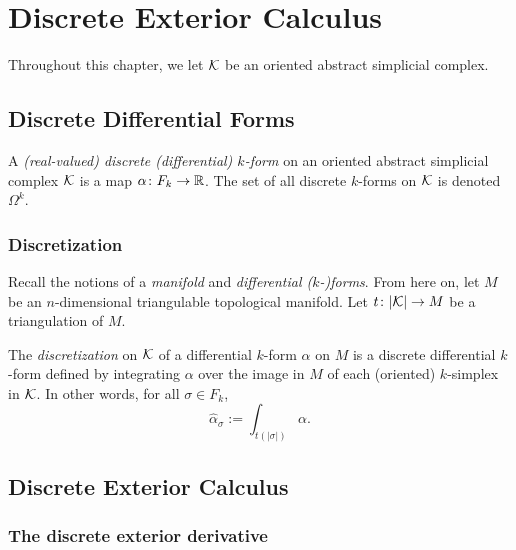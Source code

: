 \chapter{Discrete Exterior Calculus}
\label{chap:discrete_exterior_calculus}

Throughout this chapter, we let $\mathcal{K}$ be an oriented abstract simplicial complex. %

\section{Discrete Differential Forms}

\begin{definition}\label{def:discrete_k-form}
    A \emph{(real-valued) discrete (differential) $k$-form} on an oriented abstract simplicial complex $\mathcal{K}$ is a map $\alpha\colon F_k \to \mathbb{R}$. The set of all discrete $k$-forms on $\mathcal{K}$ is denoted $\Omega^k$.
\end{definition}

\subsection{Discretization}

Recall the notions of a \emph{manifold} and \emph{differential ($k$-)forms}. %
From here on, let $M$ be an $n$-dimensional triangulable topological manifold. Let $t\colon |\mathcal{K}| \to M$ be a triangulation of $M$.

\begin{definition}\label{def:k-discretization}
    The \emph{discretization} on $\mathcal{K}$ of a differential $k$-form $\alpha$ on $M$ is a discrete differential $k$-form defined by integrating $\alpha$ over the image in $M$ of each (oriented) $k$-simplex in $\mathcal{K}$. In other words, for all $\sigma \in F_k$,
    \[ \hat{\alpha}_\sigma := \int_{t(|\sigma|)} \alpha. \]
\end{definition}

\section{Discrete Exterior Calculus}

\subsection{The discrete exterior derivative}

